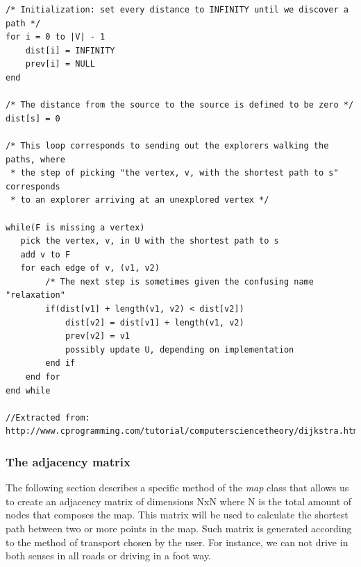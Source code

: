 \documentclass{article}
\begin{document}
\begin{lstlisting}
/* Initialization: set every distance to INFINITY until we discover a path */
for i = 0 to |V| - 1
    dist[i] = INFINITY
    prev[i] = NULL
end

/* The distance from the source to the source is defined to be zero */
dist[s] = 0

/* This loop corresponds to sending out the explorers walking the paths, where
 * the step of picking "the vertex, v, with the shortest path to s" corresponds
 * to an explorer arriving at an unexplored vertex */

while(F is missing a vertex)
   pick the vertex, v, in U with the shortest path to s
   add v to F
   for each edge of v, (v1, v2)
        /* The next step is sometimes given the confusing name "relaxation"
        if(dist[v1] + length(v1, v2) < dist[v2])
            dist[v2] = dist[v1] + length(v1, v2)
            prev[v2] = v1
            possibly update U, depending on implementation
        end if
    end for
end while

//Extracted from: http://www.cprogramming.com/tutorial/computersciencetheory/dijkstra.html
\end{lstlisting}

\subsubsection{The adjacency matrix}
The following section describes a specific method of the \textit{map} class that allows us to create an adjacency matrix of dimensions NxN where N is the total amount of nodes that composes the map. This matrix will be used to calculate the shortest path between two or more points in the map. Such matrix is generated according to the method of transport chosen by the user. For instance, we can not drive in both senses in all roads or driving in a foot way.
\end{document}
